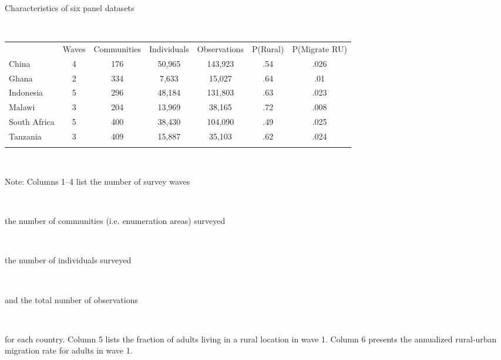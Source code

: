 \begin{center}
\smallskip\begin{large}Characteristics of six panel datasets\end{large}\\
\smallskip
\begin{tabular}{lcccccc}
\hline \noalign{\smallskip} & Waves & Communities & Individuals & Observations & P(Rural) & P(Migrate R\-U)\\
\noalign{\smallskip}\hline \noalign{\smallskip}China & 4 & 176 & 50,965 & 143,923 & .54 & .026\\
Ghana & 2 & 334 & 7,633 & 15,027 & .64 & .01\\
Indonesia & 5 & 296 & 48,184 & 131,803 & .63 & .023\\
Malawi & 3 & 204 & 13,969 & 38,165 & .72 & .008\\
South Africa & 5 & 400 & 38,430 & 104,090 & .49 & .025\\
Tanzania & 3 & 409 & 15,887 & 35,103 & .62 & .024\\
\noalign{\smallskip}\hline\end{tabular}\\
\begin{footnotesize}Note: Columns 1–4 list the number of survey waves\end{footnotesize}\\
\begin{footnotesize}the number of communities (i.e. enumeration areas) surveyed\end{footnotesize}\\
\begin{footnotesize}the number of individuals surveyed\end{footnotesize}\\
\begin{footnotesize}and the total number of observations\end{footnotesize}\\
\begin{footnotesize}for each country. Column 5 lists the fraction of adults living in a rural location in wave 1. Column 6 presents the annualized rural-urban migration rate for adults in wave 1.        \end{footnotesize}\\
\smallskip
\end{center}

